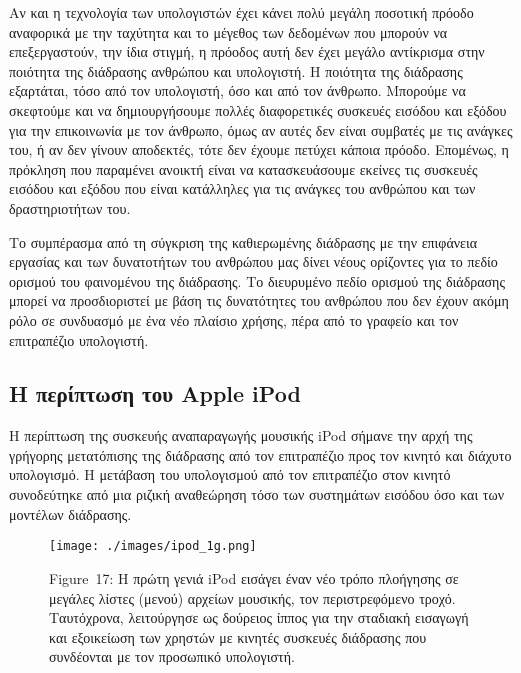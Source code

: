 \documentclass[
]{article}
\begin{document}
Αν και η τεχνολογία των υπολογιστών έχει κάνει πολύ μεγάλη ποσοτική
πρόοδο αναφορικά με την ταχύτητα και το μέγεθος των δεδομένων που
μπορούν να επεξεργαστούν, την ίδια στιγμή, η πρόοδος αυτή δεν έχει
μεγάλο αντίκρισμα στην ποιότητα της διάδρασης ανθρώπου και υπολογιστή. Η
ποιότητα της διάδρασης εξαρτάται, τόσο από τον υπολογιστή, όσο και από
τον άνθρωπο. Μπορούμε να σκεφτούμε και να δημιουργήσουμε πολλές
διαφορετικές συσκευές εισόδου και εξόδου για την επικοινωνία με τον
άνθρωπο, όμως αν αυτές δεν είναι συμβατές με τις ανάγκες του, ή αν δεν
γίνουν αποδεκτές, τότε δεν έχουμε πετύχει κάποια πρόοδο. Επομένως, η
πρόκληση που παραμένει ανοικτή είναι να κατασκευάσουμε εκείνες τις
συσκευές εισόδου και εξόδου που είναι κατάλληλες για τις ανάγκες του
ανθρώπου και των δραστηριοτήτων του.

Το συμπέρασμα από τη σύγκριση της καθιερωμένης διάδρασης με την
επιφάνεια εργασίας και των δυνατοτήτων του ανθρώπου μας δίνει νέους
ορίζοντες για το πεδίο ορισμού του φαινομένου της διάδρασης. Το
διευρυμένο πεδίο ορισμού της διάδρασης μπορεί να προσδιοριστεί με βάση
τις δυνατότητες του ανθρώπου που δεν έχουν ακόμη ρόλο σε συνδυασμό με
ένα νέο πλαίσιο χρήσης, πέρα από το γραφείο και τον επιτραπέζιο
υπολογιστή.

\hypertarget{ux3b7-ux3c0ux3b5ux3c1ux3afux3c0ux3c4ux3c9ux3c3ux3b7-ux3c4ux3bfux3c5-apple-ipod}{%
\subsection{Η περίπτωση του Apple
iPod}\label{ux3b7-ux3c0ux3b5ux3c1ux3afux3c0ux3c4ux3c9ux3c3ux3b7-ux3c4ux3bfux3c5-apple-ipod}}

Η περίπτωση της συσκευής αναπαραγωγής μουσικής iPod σήμανε την αρχή της
γρήγορης μετατόπισης της διάδρασης από τον επιτραπέζιο προς τον κινητό
και διάχυτο υπολογισμό. Η μετάβαση του υπολογισμού από τον επιτραπέζιο
στον κινητό συνοδεύτηκε από μια ριζική αναθεώρηση τόσο των συστημάτων
εισόδου όσο και των μοντέλων διάδρασης.

\leavevmode{}%
\begin{figure}
\hypertarget{fig:ipod_1g}{%
\centering
\texttt{[image: ./images/ipod\_1g.png]}
\caption{Figure~17: Η πρώτη γενιά iPod εισάγει έναν νέο τρόπο πλοήγησης
σε μεγάλες λίστες (μενού) αρχείων μουσικής, τον περιστρεφόμενο τροχό.
Ταυτόχρονα, λειτούργησε ως δούρειος ίππος για την σταδιακή εισαγωγή και
εξοικείωση των χρηστών με κινητές συσκευές διάδρασης που συνδέονται με
τον προσωπικό υπολογιστή.}\label{fig:ipod_1g}
}
\end{figure}
\end{document}
